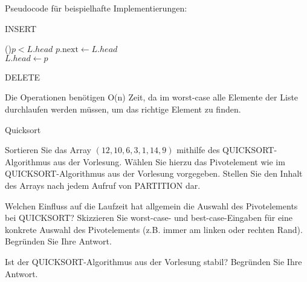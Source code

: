 \documentclass{exercisesheet}
\begin{document}
\begin{solutions}
  \item Pseudocode für beispielhafte Implementierungen:
  \begin{algorithm}[ht]
    \caption{INSERT}
    \ElseIf(){$p < L.head$}{
      $p.\text{next} \gets L.head$ \\
      $L.head \gets p$
    }
  \end{algorithm}

  \begin{algorithm}[ht]
    \caption{DELETE}
  \end{algorithm}

  \item Die Operationen benötigen O(n) Zeit, da im worst-case alle Elemente der Liste durchlaufen werden müssen, um das richtige Element zu finden.
\end{solutions}

\begin{exercises}{Quicksort}
\item Sortieren Sie das Array $(12, 10, 6, 3, 1, 14, 9)$ mithilfe des QUICKSORT-Algorithmus aus der Vorlesung. Wählen Sie hierzu das Pivotelement wie im QUICKSORT-Algorithmus aus der Vorlesung vorgegeben. Stellen Sie den Inhalt des Arrays nach jedem Aufruf von PARTITION dar.
\item Welchen Einfluss auf die Laufzeit hat allgemein die Auswahl des Pivotelements bei QUICKSORT? Skizzieren Sie worst-case- und best-case-Eingaben für eine konkrete Auswahl des Pivotelements (z.B. immer am linken oder rechten Rand). Begründen Sie Ihre Antwort.
\item Ist der QUICKSORT-Algorithmus aus der Vorlesung stabil? Begründen Sie Ihre Antwort.
\end{exercises}
\end{document}
